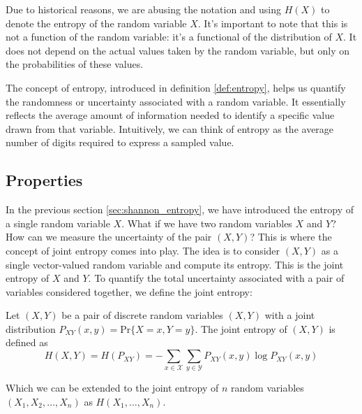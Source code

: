 \begin{remark}
    Due to historical reasons, we are abusing the notation and using $H(X)$ to denote the entropy of the random variable $X$. It's important to note that this is not a function of the random variable: it's a functional of the distribution of $X$. It does not depend on the actual values taken by the random variable, but only on the probabilities of these values.
\end{remark}

\noindent The concept of entropy, introduced in definition \ref{def:entropy}, helps us quantify the randomness or uncertainty associated with a random variable. It essentially reflects the average amount of information needed to identify a specific value drawn from that variable. Intuitively, we can think of entropy as the average number of digits required to express a sampled value.



\subsection{Properties}
In the previous section \ref{sec:shannon_entropy}, we have introduced the entropy of a single random variable $X$. What if we have two random variables $X$ and $Y$? How can we measure the uncertainty of the pair $(X,Y)$? This is where the concept of joint entropy comes into play. The idea is to consider $(X,Y)$ as a single vector-valued random variable and compute its entropy. This is the joint entropy of $X$ and $Y$. To quantify the total uncertainty associated with a pair of variables considered together, we define the joint entropy:

\begin{definition}\label{def:joint_entropy}
    Let $(X,Y)$ be a pair of discrete random variables $(X,Y)$ with a joint distribution $P_{XY}(x,y) = \text{Pr}\{X=x,Y=y\}$. The joint entropy of $(X,Y)$ is defined as
    \begin{equation}\label{eq:joint_entropy}
        H(X,Y) = H(P_{XY}) = -\sum_{x\in\mathcal{X}}\sum_{y\in\mathcal{Y}} P_{XY}(x,y)\log P_{XY}(x,y)
    \end{equation}
\end{definition}
\noindent Which we can be extended to the joint entropy of $n$ random variables $(X_1,X_2,\ldots,X_n)$ as $H(X_1,\ldots, X_n)$.

